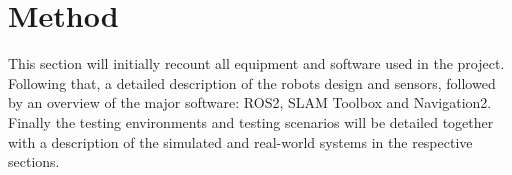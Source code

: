\section{Method}

This section will initially recount all equipment and software used in the project. Following that, a detailed description of the robots design and sensors, followed by an overview of the major software: ROS2, SLAM Toolbox and Navigation2. Finally the testing environments and testing scenarios will be detailed together with a description of the simulated and real-world systems in the respective sections.



